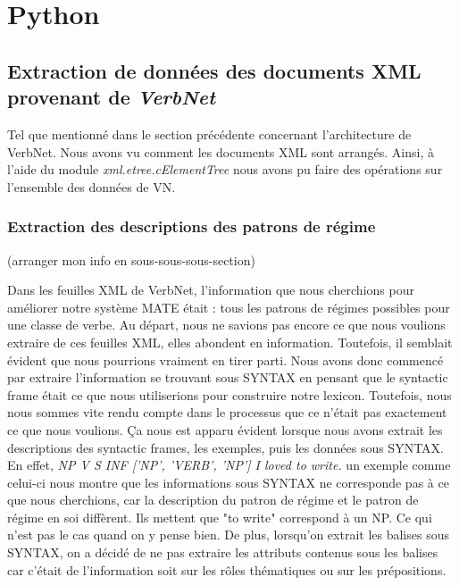 \documentclass[12pt,maitrise,frenchb,natbib,twoside,initial]{dms}
\numberwithin{equation}{section}
\numberwithin{table}{chapter}
\numberwithin{figure}{chapter}
\begin{document}
\section{Python}

\subsection{Extraction de données des documents XML provenant de \emph{VerbNet} }

Tel que mentionné dans le section précédente concernant l'architecture de VerbNet. Nous avons vu comment les documents XML sont  arrangés. Ainsi, à l'aide du module \emph{xml.etree.cElementTree} nous avons pu faire des opérations sur l'ensemble des données de VN.

\subsubsection{Extraction des descriptions des  patrons de régime}

(arranger mon info en sous-sous-sous-section)

Dans les feuilles XML de VerbNet, l'information que nous cherchions pour améliorer notre système MATE était : tous les patrons de régimes possibles pour une classe de verbe. Au départ, nous ne savions pas encore ce que nous voulions extraire de ces feuilles XML, elles abondent en information. Toutefois, il semblait évident que nous pourrions vraiment en tirer parti. Nous avons donc commencé par extraire l'information se trouvant sous SYNTAX en pensant que le syntactic frame était ce que nous utiliserions pour construire notre lexicon. Toutefois, nous nous sommes vite rendu compte dans le processus que ce n'était pas exactement ce que  nous voulions. Ça nous est apparu évident lorsque nous avons extrait les descriptions des syntactic frames, les exemples, puis les données sous SYNTAX. En effet, \emph{ NP V S INF ['NP', 'VERB', 'NP'] I loved to write.} un exemple comme celui-ci nous montre que les informations sous SYNTAX ne corresponde pas à ce que nous cherchions, car la description du patron de régime et le patron de régime en soi diffèrent. Ils mettent que "to write" correspond à un NP. Ce qui n'est pas le cas quand on y pense bien. De plus, lorsqu'on extrait les balises sous SYNTAX, on a décidé de ne pas extraire les attributs contenus sous les balises car c'était de l'information soit sur les rôles thématiques ou sur les prépositions. 
\end{document}
